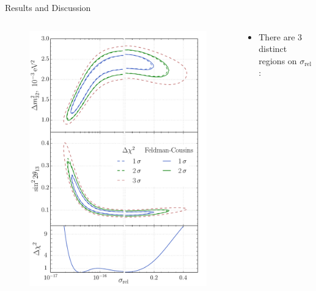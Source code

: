 \documentclass[usenames, dvipsnames]{beamer}
\newcommand{\Important}{\textcolor{BrickRed}}
\newcommand{\impitem}{\item[\Important{$\bullet$}]}
\newcommand{\srel}{\ensuremath{\sigma_{\text{rel}}}}
\begin{document}
\begin{frame}[fragile]
\begin{columns}[T]
\begin{column}{.47\textwidth}
\vspace{.3cm}
\begin{block}{Results and Discussion}
    \begin{columns}[T]
        \begin{column}{0.42\textwidth}
            \begin{figure}[T]
                \hspace*{-0.7cm}
                \includegraphics[scale=1.15]{./pics/scan_db_s-dm-th_ihep-fc_v2.pdf}
            \end{figure}
        \end{column}
        \begin{column}{0.57\textwidth}
            \vspace{1cm}
            \begin{itemize}
                \impitem There are 3 distinct regions on \Important{\srel}:

\end{itemize}
\end{column}
\end{columns}
\end{block}
\end{column}
\end{columns}
\end{frame}
\end{document}
